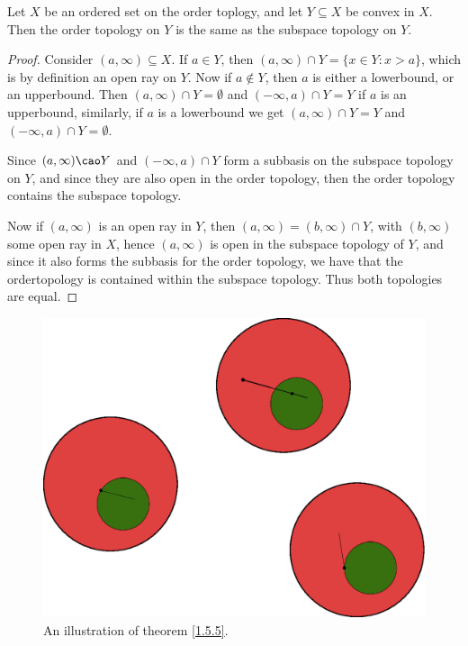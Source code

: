 \begin{theorem}\label{1.5.5}
    Let $X$ be an ordered set on the order toplogy, and let  $Y \subseteq X$ be convex in  $X$.
    Then the order topology on  $Y$ is the same as the subspace topology on  $Y$.
\end{theorem}
\begin{proof}
    Consider $(a, \infty) \subseteq X$. If  $a \in Y$, then  $(a,\infty) \cap Y=\{x \in Y: x>a\}$,
    which is by definition an open ray on $Y$. Now if  $a \notin Y$, then  $a$ is either a lowerbound, or
    an upperbound. Then  $(a, \infty) \cap Y=\emptyset$ and  $(-\infty,a) \cap Y=Y$ if  $a$ is an
    upperbound, similarly, if  $a$ is a lowerbound we get  $(a, \infty) \cap Y=Y$ and  $(-\infty,a) \cap Y=\emptyset$.

    Since $(a, \infty) \cao Y$ and  $(-\infty,a) \cap Y$ form a subbasis on the subspace topology on  $Y$,
    and since they are also open in  the order topology, then the order topology contains the subspace topology.

    Now if  $(a, \infty)$ is an open ray in  $Y$, then  $(a,\infty)=(b,\infty) \cap Y$, with $(b, \infty)$
    some open ray in  $X$, hence  $(a, \infty)$ is open in the subspace topology of  $Y$, and since
    it also forms the subbasis for the order topology, we have that the ordertopology is contained within the subspace
    topology. Thus both topologies are equal.
\end{proof}

\begin{figure}[h]
    \centering
    \includegraphics[scale = 0.5]{Figures/Chapter1/thm_1_55.eps}
    \caption{An illustration of theorem \ref{1.5.5}.}
    \label{fig1.7}
\end{figure}

